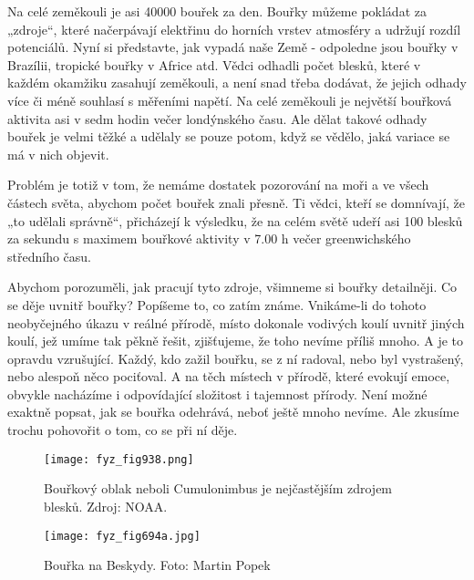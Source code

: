     Na celé zeměkouli je asi \num{40 000} bouřek za den. Bouřky můžeme pokládat za „zdroje“, které
    načerpávají elektřinu do horních vrstev atmosféry a udržují rozdíl potenciálů. Nyní si
    představte, jak vypadá naše Země - odpoledne jsou bouřky v Brazílii, tropické bouřky v Africe
    atd. Vědci odhadli počet blesků, které v každém okamžiku zasahují zeměkouli, a není snad třeba
    dodávat, že jejich odhady více či méně souhlasí s měřeními napětí. Na celé zeměkouli je největší
    bouřková aktivita asi v sedm hodin večer londýnského času. Ale dělat takové odhady bouřek je
    velmi těžké a udělaly se pouze potom, když se vědělo, jaká variace se má v nich objevit.
  
    Problém je totiž v tom, že nemáme dostatek pozorování na moři a ve všech částech světa, abychom
    počet bouřek znali přesně. Ti vědci, kteří se domnívají, že „to udělali správně“, přicházejí k
    výsledku, že na celém světě udeří asi \num{100} blesků za sekundu s maximem bouřkové aktivity v
    7.00 h večer greenwichského středního času.

    Abychom porozuměli, jak pracují tyto zdroje, všimneme si bouřky detailněji. Co se děje uvnitř
    bouřky? Popíšeme to, co zatím známe. Vnikáme-li do tohoto neobyčejného úkazu v reálné přírodě,
    místo dokonale vodivých koulí uvnitř jiných koulí, jež umíme tak pěkně řešit, zjišťujeme, že
    toho nevíme příliš mnoho. A je to opravdu vzrušující. Každý, kdo zažil bouřku, se z ní radoval,
    nebo byl vystrašený, nebo alespoň něco pociťoval. A na těch místech v přírodě, které evokují
    emoce, obvykle nacházíme i odpovídající složitost i tajemnost přírody. Není možné exaktně
    popsat, jak se bouřka odehrává, neboť ještě mnoho nevíme. Ale zkusíme trochu pohovořit o tom, co
    se při ní děje.

    \begin{figure}[ht!] %
      \centering
      \texttt{[image: fyz\_fig938.png]}
      \caption{Bouřkový oblak neboli Cumulonimbus je nejčastějším zdrojem blesků. Zdroj: NOAA.}
      \label{fyz:fig938}
    \end{figure}

    \begin{figure}[ht!] %
      \centering
      \texttt{[image: fyz\_fig694a.jpg]}
      \caption{Bouřka na Beskydy. Foto: Martin Popek}
      \label{fyz:fig694a}
    \end{figure}

